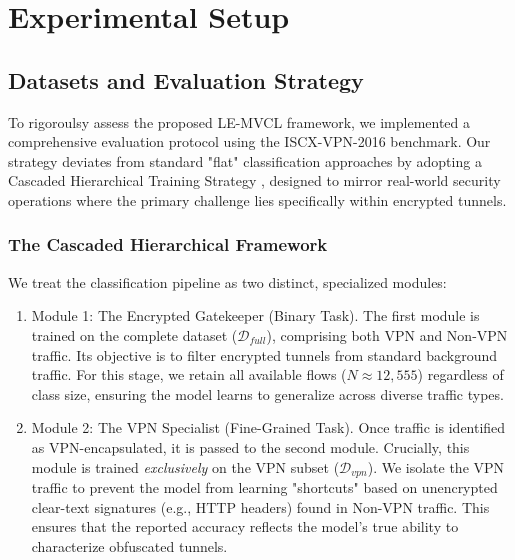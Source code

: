 \section{Experimental Setup}
\label{sec:experimental_setup}

\subsection{Datasets and Evaluation Strategy}
\label{subsec:datasets_strategy}

To rigoroulsy assess the proposed LE-MVCL framework, we implemented a comprehensive evaluation protocol using the ISCX-VPN-2016 benchmark. Our strategy deviates from standard "flat" classification approaches by adopting a Cascaded Hierarchical Training Strategy \cite{parchekani2020rejecting,wang2025taonet}, designed to mirror real-world security operations where the primary challenge lies specifically within encrypted tunnels.

\subsubsection{The Cascaded Hierarchical Framework}
We treat the classification pipeline as two distinct, specialized modules:

\begin{enumerate}
    \item Module 1: The Encrypted Gatekeeper (Binary Task).
    The first module is trained on the complete dataset ($\mathcal{D}_{full}$), comprising both VPN and Non-VPN traffic. Its objective is to filter encrypted tunnels from standard background traffic. For this stage, we retain all available flows ($N \approx 12,555$) regardless of class size, ensuring the model learns to generalize across diverse traffic types.
    
    \item Module 2: The VPN Specialist (Fine-Grained Task).
    Once traffic is identified as VPN-encapsulated, it is passed to the second module. Crucially, this module is trained \textit{exclusively} on the VPN subset ($\mathcal{D}_{vpn}$). We isolate the VPN traffic to prevent the model from learning "shortcuts" based on unencrypted clear-text signatures (e.g., HTTP headers) found in Non-VPN traffic. This ensures that the reported accuracy reflects the model's true ability to characterize obfuscated tunnels.
\end{enumerate}

